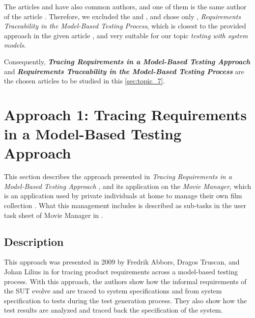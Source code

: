The articles \cite{Relevant3} and \cite{Relevant4} have also common authors, and one of them is the same author of the article \cite{Paper2}. Therefore, we excluded the \cite{Relevant3} and \cite{Relevant4}, and chose only \cite{Paper2}, \textit{Requirements Traceability in the Model-Based Testing Process}, which is closest to the provided approach in the given article \cite{Paper1}, and very suitable for our topic \textit{testing with system models}.

Consequently, \textbf{\textit{Tracing Requirements in a Model-Based Testing Approach}} \cite{Paper1} and \textbf{\textit{Requirements Traceability in the Model-Based Testing Process}}  \cite{Paper2} are the chosen articles to be studied in this \autoref{sec:topic_7}.


\section{Approach 1: Tracing Requirements in a Model-Based Testing Approach}
\label{sec:AP1}

This section describes the approach presented in \textit{Tracing Requirements in a Model-Based Testing Approach} \cite{Paper1}, and its application on the \textit{Movie Manager}, which is an application used by private individuals at home to manage their own film collection \cite{MovieManager}. What this management includes is described as sub-tasks in the user task sheet of Movie Manager in \cite{MovieManager}. 

\subsection{Description}
\label{subsec:DE1}
This approach was presented in 2009 by Fredrik Abbors, Dragos Truscan, and Johan Lilius in \cite{Paper1} for tracing product requirements across a model-based testing process. With this approach, the authors show how the informal requirements of the SUT evolve and are traced to system specifications and from system specification to tests during the test generation process. They also show how the test results are analyzed and traced back the specification of the system. 

